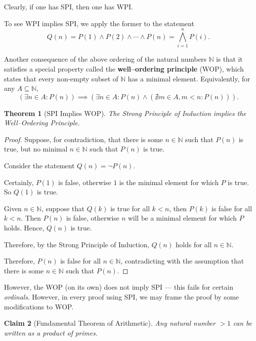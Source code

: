 \documentclass{article}
\newtheorem{theorem}{Theorem}[section]
\newtheorem{claim}[theorem]{Claim}
\theoremstyle{definition}
\theoremstyle{remark}
\newcommand{\pqty}[1]{\left(#1\right)}
\newcommand{\bigland}{\bigwedge}
\newcommand{\NN}{\mathbb{N}}
\begin{document}
Clearly, if one has SPI, then one has WPI.

To see WPI implies SPI, we apply the former to the statement
\[
    Q\pqty{n} = P\pqty{1} \land P\pqty{2} \land \cdots \land P\pqty{n} = \bigland_{i = 1}^{n} P\pqty{i}.
\]

Another consequence of the above ordering of the natural numbers \(\NN\) is that it satisfies a special property called the \textbf{well--ordering principle} (WOP), which states that every non-empty subset of \(\NN\) has a minimal element. Equivalently, for any \(A \subseteq \NN\),
\[
    \pqty{\exists n \in A: P\pqty{n}} \implies \pqty{\exists n \in A: P\pqty{n} \land \pqty{\nexists m \in A, m < n: P\pqty{n}}}.
\]

\begin{theorem}[SPI Implies WOP]
    The Strong Principle of Induction implies the Well--Ordering Principle.
\end{theorem}

\begin{proof}
    Suppose, for contradiction, that there is some \(n \in \NN\) such that \(P\pqty{n}\) is true, but no minimal \(n \in \NN\) such that \(P\pqty{n}\) is true.

    Consider the statement \(Q\pqty{n} = \lnot P\pqty{n}\).

    Certainly, \(P\pqty{1}\) is false, otherwise \(1\) is the minimal element for which \(P\) is true. So \(Q\pqty{1}\) is true.

    Given \(n \in \NN\), suppose that \(Q\pqty{k}\) is true for all \(k < n\), then \(P\pqty{k}\) is false for all \(k < n\). Then \(P\pqty{n}\) is false, otherwise \(n\) will be a minimal element for which \(P\) holds. Hence, \(Q\pqty{n}\) is true.

    Therefore, by the Strong Principle of Induction, \(Q\pqty{n}\) holds for all \(n \in \NN\).

    Therefore, \(P\pqty{n}\) is false for all \(n \in \NN\), contradicting with the assumption that there is some \(n \in \NN\) such that \(P\pqty{n}\).
\end{proof}

However, the WOP (on its own) does not imply SPI --- this fails for certain \emph{ordinals}. However, in every proof using SPI, we may frame the proof by some modifications to WOP.

\begin{claim}[Fundamental Theorem of Arithmetic]
    Any natural number \(> 1\) can be written as a product of primes.
\end{claim}
\end{document}
